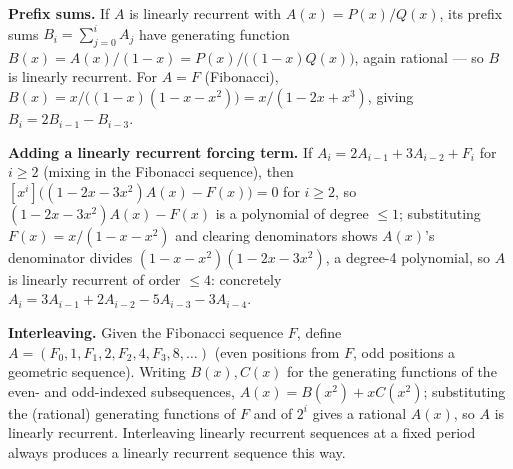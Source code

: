 \documentclass[11pt]{article}
\begin{document}
\begin{examplebox}
\textbf{Prefix sums.} If $A$ is linearly recurrent with
$A(x)=P(x)/Q(x)$, its prefix sums $B_i=\sum_{j=0}^i A_j$ have generating
function $B(x)=A(x)/(1-x) = P(x)/\bigl((1-x)Q(x)\bigr)$, again rational
--- so $B$ is linearly recurrent. For $A=F$ (Fibonacci),
$B(x) = x/\bigl((1-x)(1-x-x^2)\bigr) = x/(1-2x+x^3)$, giving
$B_i = 2B_{i-1}-B_{i-3}$.

\textbf{Adding a linearly recurrent forcing term.} If $A_i =
2A_{i-1}+3A_{i-2}+F_i$ for $i\ge 2$ (mixing in the Fibonacci sequence),
then $[x^i]\bigl((1-2x-3x^2)A(x)-F(x)\bigr)=0$ for $i \ge 2$, so
$(1-2x-3x^2)A(x)-F(x)$ is a polynomial of degree $\le 1$; substituting
$F(x)=x/(1-x-x^2)$ and clearing denominators shows $A(x)$'s denominator
divides $(1-x-x^2)(1-2x-3x^2)$, a degree-4 polynomial, so $A$ is linearly
recurrent of order $\le 4$: concretely
$A_i = 3A_{i-1}+2A_{i-2}-5A_{i-3}-3A_{i-4}$.

\textbf{Interleaving.} Given the Fibonacci sequence $F$, define
$A = (F_0, 1, F_1, 2, F_2, 4, F_3, 8, \ldots)$ (even positions from $F$,
odd positions a geometric sequence). Writing $B(x),C(x)$ for the
generating functions of the even- and odd-indexed subsequences,
$A(x) = B(x^2) + xC(x^2)$; substituting the (rational) generating
functions of $F$ and of $2^i$ gives a rational $A(x)$, so $A$ is linearly
recurrent. Interleaving linearly recurrent sequences at a fixed period
always produces a linearly recurrent sequence this way.
\end{examplebox}
\end{document}
